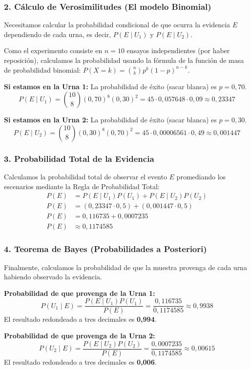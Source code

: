 \documentclass[11pt,a4paper]{article}
\begin{document}
\subsubsection*{2. Cálculo de Verosimilitudes (El modelo Binomial)}
Necesitamos calcular la probabilidad condicional de que ocurra la evidencia $E$ dependiendo de cada urna, es decir, $P(E \mid U_1)$ y $P(E \mid U_2)$.

Como el experimento consiste en $n=10$ ensayos independientes (por haber reposición), calculamos la probabilidad usando la fórmula de la función de masa de probabilidad binomial: $P(X=k) = \binom{n}{k} p^k (1-p)^{n-k}$.

\vspace{0.3cm}
\noindent \textbf{Si estamos en la Urna 1:}
La probabilidad de éxito (sacar blanca) es $p = 0,70$.
$$ P(E \mid U_1) = \binom{10}{8} (0,70)^8 (0,30)^2 = 45 \cdot 0,057648 \cdot 0,09 \approx 0,23347 $$

\vspace{0.3cm}
\noindent \textbf{Si estamos en la Urna 2:}
La probabilidad de éxito (sacar blanca) es $p = 0,30$.
$$ P(E \mid U_2) = \binom{10}{8} (0,30)^8 (0,70)^2 = 45 \cdot 0,00006561 \cdot 0,49 \approx 0,001447 $$

\subsubsection*{3. Probabilidad Total de la Evidencia}
Calculamos la probabilidad total de observar el evento $E$ promediando los escenarios mediante la Regla de Probabilidad Total:
\begin{align*}
P(E) &= P(E \mid U_1)P(U_1) + P(E \mid U_2)P(U_2) \\
P(E) &= (0,23347 \cdot 0,5) + (0,001447 \cdot 0,5) \\
P(E) &= 0,116735 + 0,0007235 \\
P(E) &\approx 0,1174585
\end{align*}

\subsubsection*{4. Teorema de Bayes (Probabilidades a Posteriori)}
Finalmente, calculamos la probabilidad de que la muestra provenga de cada urna habiendo observado la evidencia.

\vspace{0.3cm}
\noindent \textbf{Probabilidad de que provenga de la Urna 1:}
$$ P(U_1 \mid E) = \frac{P(E \mid U_1)P(U_1)}{P(E)} = \frac{0,116735}{0,1174585} \approx 0,9938 $$
El resultado redondeado a tres decimales es \textbf{0,994}.

\vspace{0.3cm}
\noindent \textbf{Probabilidad de que provenga de la Urna 2:}
$$ P(U_2 \mid E) = \frac{P(E \mid U_2)P(U_2)}{P(E)} = \frac{0,0007235}{0,1174585} \approx 0,00615 $$
El resultado redondeado a tres decimales es \textbf{0,006}.
\end{document}
